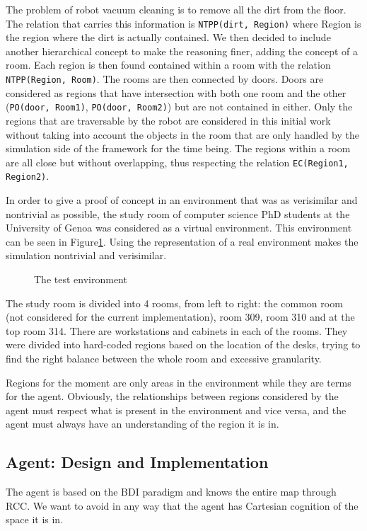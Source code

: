 The problem of robot vacuum cleaning is to remove all the dirt from the floor. 
The relation that carries this information is \texttt{NTPP(dirt, Region)} where Region is the region where the dirt is actually contained.
We then decided to include another hierarchical concept to make the reasoning finer, adding the concept of a room.
Each region is then found contained within a room with the relation \texttt{NTPP(Region, Room)}.
The rooms are then connected by doors.
Doors are considered as regions that have intersection with both one room and the other (\texttt{PO(door, Room1)}, \texttt{PO(door, Room2)}) but are not contained in either.
Only the regions that are traversable by the robot are considered in this initial work without taking into account the objects in the room that are only handled by the simulation side of the framework for the time being.
The regions within a room are all close but without overlapping, thus respecting the relation \texttt{EC(Region1, Region2)}.

In order to give a proof of concept in an environment that was as verisimilar and nontrivial as possible, the study room of computer science PhD students at the University of Genoa was considered as a virtual environment.
This environment can be seen in Figure\ref{fig:environment}.
Using the representation of a real environment makes the simulation nontrivial and verisimilar.

\begin{figure}
    \centering
    
    \label{fig:environment}
    \caption{The test environment}
\end{figure}

The study room is divided into 4 rooms, from left to right: the common room (not considered for the current implementation), room 309, room 310 and at the top room 314.
There are workstations and cabinets in each of the rooms.
They were divided into hard-coded regions based on the location of the desks, trying to find the right balance between the whole room and excessive granularity.

Regions for the moment are only areas in the environment while they are terms for the agent. 
Obviously, the relationships between regions considered by the agent must respect what is present in the environment and vice versa, and the agent must always have an understanding of the region it is in.

\subsection{Agent: Design and Implementation}
The agent is based on the BDI paradigm and knows the entire map through RCC. 
We want to avoid in any way that the agent has Cartesian cognition of the space it is in.

